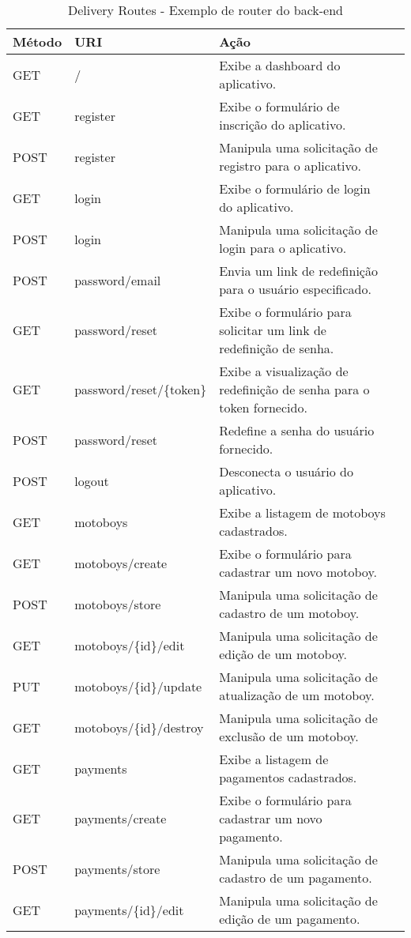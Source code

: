 \newpage
\begin{table}[H]
    \centering
    \caption{Delivery Routes - Exemplo de router do back-end
    \label{tab:drRoutes}}
\begin{tabular}{llp{9.2cm}l}
\toprule
\textbf{Método} & \textbf{URI} & \textbf{Ação} \\
\midrule
GET & / & Exibe a dashboard do aplicativo. \\
GET & register & Exibe o formulário de inscrição do aplicativo. \\
POST & register & Manipula uma solicitação de registro para o aplicativo. \\
GET & login & Exibe o formulário de login do aplicativo. \\
POST & login & Manipula uma solicitação de login para o aplicativo. \\
POST & password/email & Envia um link de redefinição para o usuário especificado. \\
GET & password/reset & Exibe o formulário para solicitar um link de redefinição de senha. \\
GET & password/reset/\{token\} & Exibe a visualização de redefinição de senha para o token fornecido. \\
POST & password/reset & Redefine a senha do usuário fornecido. \\
POST & logout & Desconecta o usuário do aplicativo. \\
GET & motoboys & Exibe a listagem de motoboys cadastrados. \\
GET & motoboys/create & Exibe o formulário para cadastrar um novo motoboy. \\
POST & motoboys/store & Manipula uma solicitação de cadastro de um motoboy. \\
GET & motoboys/\{id\}/edit & Manipula uma solicitação de edição de um motoboy. \\
PUT & motoboys/\{id\}/update & Manipula uma solicitação de atualização de um motoboy. \\
GET & motoboys/\{id\}/destroy & Manipula uma solicitação de exclusão de um motoboy. \\
GET & payments & Exibe a listagem de pagamentos cadastrados. \\
GET & payments/create & Exibe o formulário para cadastrar um novo pagamento. \\
POST & payments/store & Manipula uma solicitação de cadastro de um pagamento. \\
GET & payments/\{id\}/edit & Manipula uma solicitação de edição de um pagamento. \\

\end{tabular}
\end{table}
